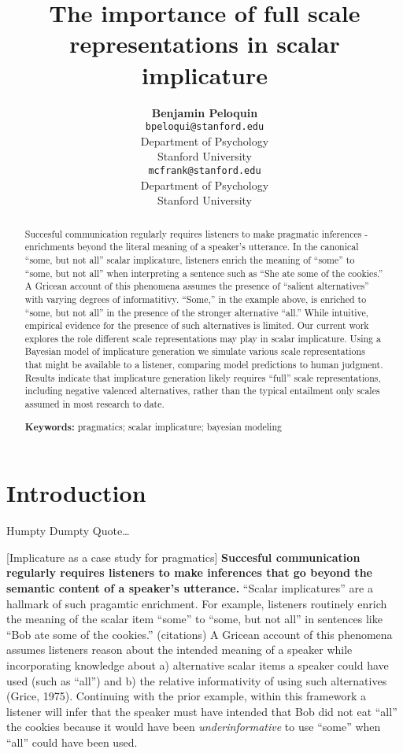 \documentclass[10pt, letterpaper]{article}
\title{The importance of full scale representations in scalar implicature}
\author{{\large \bf Benjamin Peloquin} \\ \texttt{bpeloqui@stanford.edu} \\ Department of Psychology \\ Stanford University \And {\large \bf Michael C. Frank} \\ \texttt{mcfrank@stanford.edu} \\ Department of Psychology \\ Stanford University}
\begin{document}
\maketitle

\begin{abstract}
Succesful communication regularly requires listeners to make pragmatic
inferences - enrichments beyond the literal meaning of a speaker's
utterance. In the canonical ``some, but not all'' scalar implicature,
listeners enrich the meaning of ``some'' to ``some, but not all'' when
interpreting a sentence such as ``She ate some of the cookies.'' A
Gricean account of this phenomena assumes the presence of ``salient
alternatives'' with varying degrees of informatitivy. ``Some,'' in the
example above, is enriched to ``some, but not all'' in the presence of
the stronger alternative ``all.'' While intuitive, empirical evidence
for the presence of such alternatives is limited. Our current work
explores the role different scale representations may play in scalar
implicature. Using a Bayesian model of implicature generation we
simulate various scale representations that might be available to a
listener, comparing model predictions to human judgment. Results
indicate that implicature generation likely requires ``full'' scale
representations, including negative valenced alternatives, rather than
the typical entailment only scales assumed in most research to date.

\textbf{Keywords:}
pragmatics; scalar implicature; bayesian modeling
\end{abstract}

\section{Introduction}\label{introduction}

Humpty Dumpty Quote\ldots{}

{[}Implicature as a case study for pragmatics{]}\newline
\textbf{Succesful communication regularly requires listeners to make inferences that go beyond the semantic content of a speaker's utterance.}
``Scalar implicatures'' are a hallmark of such pragamtic enrichment. For
example, listeners routinely enrich the meaning of the scalar item
``some'' to ``some, but not all'' in sentences like ``Bob ate some of
the cookies.'' (citations) A Gricean account of this phenomena assumes
listeners reason about the intended meaning of a speaker while
incorporating knowledge about a) alternative scalar items a speaker
could have used (such as ``all'') and b) the relative informativity of
using such alternatives (Grice, 1975). Continuing with the prior
example, within this framework a listener will infer that the speaker
must have intended that Bob did not eat ``all'' the cookies because it
would have been \emph{underinformative} to use ``some'' when ``all''
could have been used.
\end{document}

